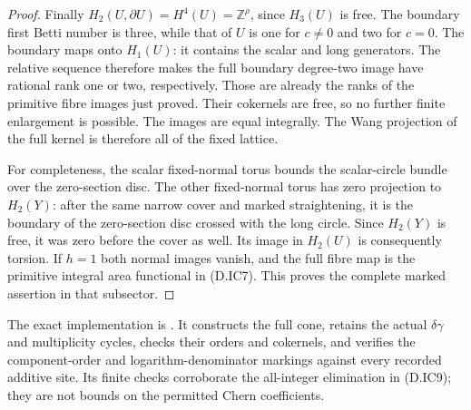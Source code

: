 \begin{proof}
Finally $H_2(U,\partial U)=H^4(U)=\mathbb Z^\rho$,
since $H_3(U)$ is free. The boundary first Betti
number is three, while that of $U$ is one for
$c\ne0$ and two for $c=0$. The boundary maps onto
$H_1(U)$: it contains the scalar and long generators.
The relative sequence therefore makes the full
boundary degree-two image have rational rank one
or two, respectively. Those are already the ranks
of the primitive fibre images just proved. Their
cokernels are free, so no further finite enlargement
is possible. The images are equal integrally.
The Wang projection of the full kernel is therefore
all of the fixed lattice.

For completeness, the scalar fixed-normal torus
bounds the scalar-circle bundle over the zero-section
disc. The other fixed-normal torus has zero projection
to $H_2(Y)$: after the same narrow cover and marked
straightening, it is the boundary of the zero-section
disc crossed with the long circle. Since $H_2(Y)$
is free, it was zero before the cover as well.
Its image in $H_2(U)$ is consequently torsion.
If $h=1$ both normal images vanish, and the full
fibre map is the primitive integral area functional
in (D.IC7). This proves the complete marked assertion
in that subsector.
\end{proof}

The exact implementation is
.
It constructs the full cone, retains the actual
$\delta\gamma$ and multiplicity cycles, checks their
orders and cokernels, and verifies the component-order
and logarithm-denominator markings against every
recorded additive site. Its finite checks corroborate
the all-integer elimination in (D.IC9); they are not
bounds on the permitted Chern coefficients.
